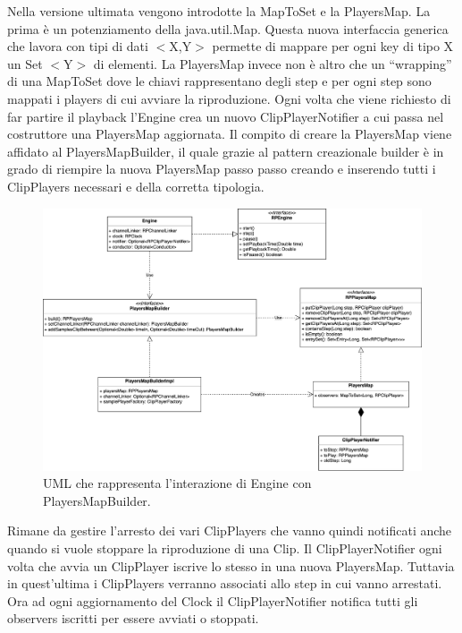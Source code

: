 \documentclass[a4paper,12pt]{report}
\begin{document}
Nella versione ultimata vengono introdotte la MapToSet e la PlayersMap. 
La prima è un potenziamento della java.util.Map. Questa nuova interfaccia generica che lavora con tipi di dati \begin{math}<\end{math}X,Y\begin{math}>\end{math} permette di mappare per ogni key di tipo X un Set \begin{math}<\end{math}Y\begin{math}>\end{math} di elementi.
La PlayersMap invece non è altro che un “wrapping” di una MapToSet dove le chiavi rappresentano degli step e per ogni step sono mappati i players di cui avviare la riproduzione.
Ogni volta che viene richiesto di far partire il playback l’Engine crea un nuovo ClipPlayerNotifier a cui passa nel costruttore una PlayersMap aggiornata.
Il compito di creare la PlayersMap viene affidato al PlayersMapBuilder, il quale grazie al pattern creazionale builder è in grado di riempire la nuova PlayersMap passo passo creando e inserendo tutti i ClipPlayers necessari e della corretta tipologia.

\begin{figure}[H]
\centering{}
\includegraphics[width=\textwidth]{img/engine.png}
\caption{UML che rappresenta l'interazione di Engine con PlayersMapBuilder.}
\end{figure}

Rimane da gestire l’arresto dei vari ClipPlayers che vanno quindi notificati anche quando si vuole stoppare la riproduzione di una Clip.
Il ClipPlayerNotifier ogni volta che avvia un ClipPlayer iscrive lo stesso in una nuova PlayersMap. Tuttavia in quest’ultima i ClipPlayers verranno associati allo step in cui vanno arrestati.
Ora ad ogni aggiornamento del Clock il ClipPlayerNotifier notifica tutti gli observers iscritti per essere avviati o stoppati.
\end{document}
